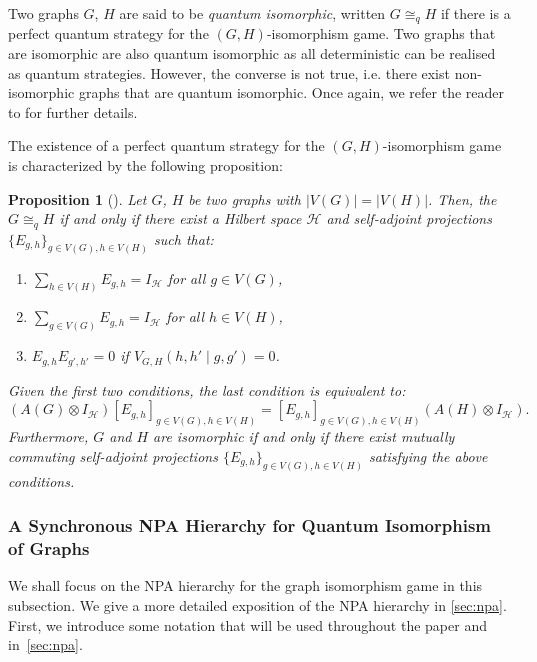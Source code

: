 \documentclass[a4paper,onecolumn,11pt,accepted=2026-01-06]{quantumarticle}
\theoremstyle{plain}
\newtheorem{prop}[thm]{Proposition}
\theoremstyle{remark}
\theoremstyle{definition}
\newcommand{\card}[1]{\left\lvert #1 \right\rvert}
\begin{document}
Two graphs $G$, $H$ are said to be \emph{quantum isomorphic}, written $G \cong_q H$ if there is a perfect quantum strategy for the $(G,H)$-isomorphism game. Two graphs that are isomorphic are also quantum isomorphic as all deterministic %
can be realised as quantum strategies. However, the converse is not true, i.e. there exist non-isomorphic graphs that are quantum isomorphic. Once again, we refer the reader to \cite{ATSERIAS2019289} for further details. 

The existence of a perfect quantum strategy for the $(G,H)$-isomorphism game is characterized by the following proposition:


\begin{prop}[\cite{ATSERIAS2019289}]\label{prop:perf-strat-graph}
    Let $G$, $H$ be two graphs with $\card{V(G)} = \card{V(H)}$. Then, the $G \cong_q H$ if and only if there exist a Hilbert space $\mathcal{H}$ and self-adjoint projections $\{E_{g,h}\}_{g \in V(G), h \in V(H)}$ such that: 
    \begin{enumerate}[label = \roman*.]
        \item $\sum_{h \in V(H)} E_{g,h} = I_{\mathcal{H}}$ for all $g \in V(G)$, 
        \item $\sum_{g \in V(G)} E_{g,h} = I_{\mathcal{H}}$ for all $h \in V(H)$, %
        \item $E_{g,h} E_{g',h'} = 0$ if $V_{G,H}(h,h'\mid g,g') = 0$.
    \end{enumerate}
    Given the first two conditions, the last condition is equivalent to: 
    $$(A(G)\otimes I_{\mathcal{H}})[E_{g,h}]_{g \in V(G), h \in V(H)} = [E_{g,h}]_{g \in V(G), h \in V(H)}(A(H) \otimes I_\mathcal{H}).$$ Furthermore, $G$ and $H$ are isomorphic if and only if there exist mutually commuting self-adjoint projections $\{E_{g,h}\}_{g \in V(G), h \in V(H)}$ satisfying the above conditions.   
\end{prop}

\subsubsection{A Synchronous NPA Hierarchy for Quantum Isomorphism of Graphs}

We shall focus on the NPA hierarchy for the graph isomorphism game in this subsection. We give a more detailed exposition of the NPA hierarchy in \cref{sec:npa}. First, we introduce some notation that will be used throughout the paper and in~\cref{sec:npa}. 
\end{document}
